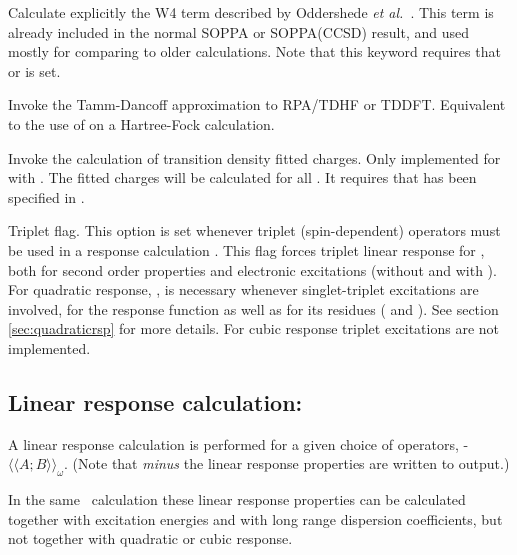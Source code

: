 \begin{description}
\item{}
Calculate explicitly the W4 term described by Oddershede {\it et
al.\/}~\cite{jopjdycpr2}. This term is already included in the normal
SOPPA or
SOPPA(CCSD) result, and used mostly for comparing to older
calculations. Note that this keyword requires that  or
is set.

\item{}
Invoke the Tamm-Dancoff approximation to RPA/TDHF or TDDFT. Equivalent to the
use of  on a Hartree-Fock calculation.

\item{}
Invoke the calculation of transition density fitted charges. Only implemented for
 with . The fitted charges will be calculated for
all . It requires that  has been specified in
.

\item{}
Triplet flag. This option is set whenever triplet
(spin-dependent)
operators must be used in a response calculation
\cite{jodlypjjcp91,ovhapjhjajthjojcp97}.
This flag forces triplet linear response for ,
both for second order properties and electronic excitations
(without and with ).
For quadratic response, ,  is necessary
whenever singlet-triplet excitations are involved, for the response function as well as  for
its residues ( and ).
See section \ref{sec:quadraticrsp} for more details.
For cubic response triplet excitations are not implemented.

\end{description}

\subsection{Linear response calculation: }
\label{sec:linearrsp}

A linear response
\cite{jodlypjjcp91,pjhjajjojcp89} calculation is performed for a given
choice of operators,
-$\langle\!\langle A; B \rangle\!\rangle_{\omega}$.
(Note that {\em minus} the linear response properties are written to output.)

In the same \resp\ calculation these linear response properties can be calculated
together with excitation energies
and with long range dispersion coefficients, but not
together with quadratic or cubic response.

